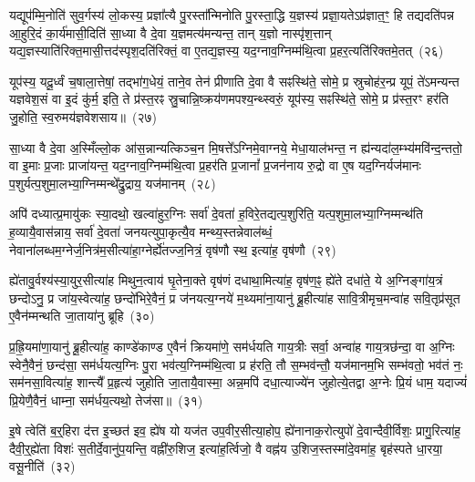 यद्यूप॑म्मि॒नोति॑ सुव॒र्गस्य॑ लो॒कस्य॒ प्रज्ञा᳚त्यै पु॒रस्ता᳚न्मिनोति पु॒रस्ता॒द्धि य॒ज्ञस्य॑ प्रज्ञा॒यते\-ऽप्र॑ज्ञात॒ꣳ॒ हि तद्यदति॑पन्न आ॒हुरि॒दं का॒र्य॑मासी॒दिति॑ सा॒ध्या वै दे॒वा य॒ज्ञमत्य॑मन्यन्त॒ तान् य॒ज्ञो नास्पृ॑श॒त्तान् यद्य॒ज्ञस्याति॑रिक्त॒मासी॒त्तद॑स्पृश॒\-दति॑रिक्तं॒ वा ए॒तद्य॒ज्ञस्य॒ यद॒ग्नाव॒ग्निम्म॑थि॒त्वा प्र॒हर॒त्यति॑रिक्तमे॒तत्~(२६)

यूप॑स्य॒ यदू॒र्ध्वं च॒षाला॒त्तेषां॒ तद्भा॑ग॒धेयं॒ ताने॒व तेन॑ प्रीणाति दे॒वा वै सꣴस्थि॑ते॒ सोमे॒ प्र स्रुचोह॑र॒न्प्र यूपं॒ ते॑\-ऽमन्यन्त यज्ञवेश॒सं वा इ॒दं कु॑र्म॒ इति॒ ते प्र॑स्त॒रꣴ स्रु॒चान्नि॒ष्क्रय॑णमपश्य॒न्थ्स्वरुं॒ यूप॑स्य॒ सꣴस्थि॑ते॒ सोमे॒ प्र प्र॑स्त॒रꣳ हर॑ति जु॒होति॒ स्व॒रुमय॑ज्ञवेशसाय॥~(२७)

{}%

सा॒ध्या वै दे॒वा अ॒स्मिँल्लो॒क आ॑स॒न्नान्यत्किञ्च॒न मि॒षत्ते᳚\-ऽग्निमे॒वाग्नये॒ मेधा॒याल॑भन्त॒ न ह्य॑न्यदा॑ल॒म्भ्य॑मवि॑न्द॒न्ततो॒ वा इ॒माः प्र॒जाः प्राजा॑यन्त॒ यद॒ग्नाव॒ग्निम्म॑थि॒त्वा प्र॒हर॑ति प्र॒जानां᳚ प्र॒जन॑नाय रु॒द्रो वा ए॒ष यद॒ग्निर्यज॑मानः प॒शुर्यत्प॒शुमा॒लभ्या॒ग्निम्मन्थे᳚द्रु॒द्राय॒ यज॑मानम्~(२८)

अपि॑ दध्यात्प्र॒मायु॑कः स्या॒दथो॒ खल्वा॑हुर॒ग्निः सर्वा॑ दे॒वता॑ ह॒विरे॒तद्यत्प॒शुरिति॒ यत्प॒शुमा॒लभ्या॒ग्निम्मन्थ॑ति ह॒व्यायै॒वास॑न्नाय॒ सर्वा॑ दे॒वता॑ जनयत्युपा॒कृत्यै॒व मन्थ्य॒स्तन्नेवाल॑ब्धं॒ नेवाना॑लब्धम॒ग्नेर्ज॒नित्र॑म॒सीत्या॑हा॒ग्नेर्\mbox{}ह्ये॑तज्ज॒नित्रं॒ वृष॑णौ स्थ॒ इत्या॑ह॒ वृष॑णौ~(२९)

ह्ये॑तावु॒र्वश्य॑स्या॒युर॒सीत्या॑ह मिथुन॒त्वाय॑ घृ॒तेना॒क्ते वृष॑णं दधाथा॒मित्या॑ह॒ वृष॑ण॒ꣴ॒ ह्ये॑ते दधा॑ते॒ ये अ॒ग्निङ्गा॑य॒त्रं छन्दो\-ऽनु॒ प्र जा॑य॒स्वेत्या॑ह॒ छन्दो॑भिरे॒वैनं॒ प्र ज॑नयत्य॒ग्नये॑ म॒थ्यमा॑ना॒यानु॑ ब्रू॒हीत्या॑ह सावि॒त्रीमृच॒मन्वा॑ह सवि॒तृप्र॑सूत ए॒वैन॑म्मन्थति जा॒ताया॑नु ब्रूहि~(३०)

प्र॒ह्रि॒यमा॑णा॒यानु॑ ब्रू॒हीत्या॑ह॒ काण्डे॑काण्ड ए॒वैनं॑ क्रियमा॑णे॒ सम॑र्धयति गाय॒त्रीः सर्वा॒ अन्वा॑ह गाय॒त्रछ॑न्दा॒ वा अ॒ग्निः स्वेनै॒वैनं॒ छन्द॑सा॒ सम॑र्धयत्य॒ग्निः पु॒रा भव॑त्य॒ग्निम्म॑थि॒त्वा प्र ह॑रति॒ तौ स॒म्भव॑न्तौ॒ यज॑मानम॒भि सम्भ॑वतो॒ भव॑तं नः॒ सम॑नसा॒वित्या॑ह॒ शान्त्यै᳚ प्र॒हृत्य॑ जुहोति जा॒तायै॒वास्मा॒ अन्न॒मपि॑ दधा॒त्याज्ये॑न जुहोत्ये॒तद्वा अ॒ग्नेः प्रि॒यं धाम॒ यदाज्यं॑ प्रि॒येणै॒वैनं॒ धाम्ना॒ सम॑र्धय॒त्यथो॒ तेज॑सा॥~(३१)

{\anuvakamend[{यज॑मानमाह॒ वृष॑णौ जाता॒यानु॑ब्रू॒ह्यप्य॒ष्टाद॑श च}]}%

इ॒षे त्वेति॑ ब॒र्॒\mbox{}हिरा द॑त्त इ॒च्छत॑ इव॒ ह्ये॑ष यो यज॑त उप॒वीर॒सीत्या॒होप॒ ह्ये॑नानाक॒रोत्युपो॑ दे॒वान्दैवी॒र्विशः॒ प्रागु॒रित्या॑ह॒ दैवी॒र्॒\mbox{}ह्ये॑ता विशः॑ स॒तीर्दे॒वानु॑प॒यन्ति॒ वह्नी॑रु॒शिज॒ इत्या॑ह॒र्त्विजो॒ वै वह्न॑य उ॒शिज॒स्तस्मा॑दे॒वमा॑ह॒ बृह॑स्पते धा॒रया॒ वसू॒नीति॑~(३२)

